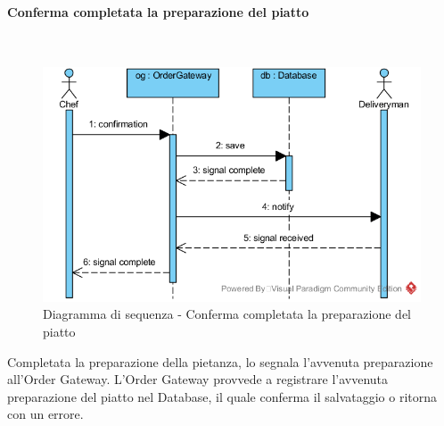\begin{samepage}
\paragraph{Conferma completata la preparazione del piatto}\mbox{}\\
\end{samepage}
\begin{figure}[H]
	\centering
	\includegraphics[width=15cm]{diagrammi_img/sequenza/cuoco_piatto_pronto.png}
	\caption{Diagramma di sequenza - Conferma completata la preparazione del piatto}
\end{figure}
Completata la preparazione della pietanza, lo \Chef{} segnala l'avvenuta preparazione all'Order Gateway. L'Order Gateway provvede a registrare l'avvenuta preparazione del piatto nel Database, il quale conferma il salvataggio o ritorna con un errore.


\subsubsection{\Deliveryman{}}

